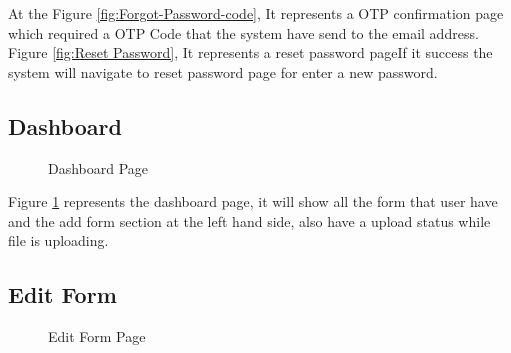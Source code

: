 \documentclass[12pt,oneside,openright,a4paper]{cpe-english-project}
\begin{document}
At the Figure \ref{fig:Forgot-Password-code}, It represents a OTP confirmation page which required a OTP Code that the system have send to the email address. Figure \ref{fig:Reset Password}, It represents a reset password pageIf it success the system will navigate to reset password page for enter a new password.

\newpage
\subsection{Dashboard}

\begin{figure}[!h]
\centering
{}
\caption{Dashboard Page}\label{fig:Dashboard}
\end{figure}

Figure \ref{fig:Dashboard} represents the dashboard page, it will show all the form that user have and the add form section at the left hand side, also have a upload status while file is uploading.

\newpage
\subsection{Edit Form}

\begin{figure}[!h]
\centering
{}
\caption{Edit Form Page}\label{fig:edit-form}
\end{figure}
\end{document}
